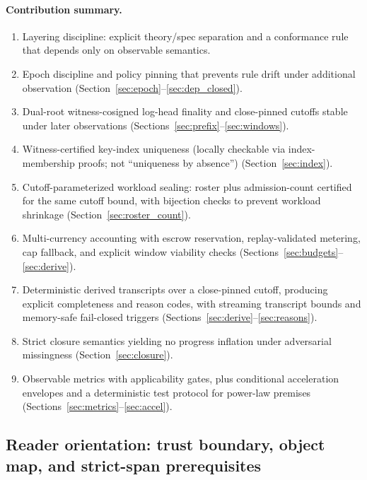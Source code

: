 \documentclass[11pt]{article}
\newcommand{\1}{\mathbf{1}}
\theoremstyle{definition}
\theoremstyle{plain}
\newenvironment{tightenum}{\begin{enumerate}\setlength\itemsep{0.2em}}{\end{enumerate}}
\begin{document}
\paragraph{Contribution summary.}
\begin{tightenum}
\item Layering discipline: explicit theory/spec separation and a conformance rule that depends only on observable semantics.
\item Epoch discipline and policy pinning that prevents rule drift under additional observation (Section~\ref{sec:epoch}--\ref{sec:dep_closed}).
\item Dual-root witness-cosigned log-head finality and close-pinned cutoffs stable under later observations (Sections~\ref{sec:prefix}--\ref{sec:windows}).
\item Witness-certified key-index uniqueness (locally checkable via index-membership proofs; not ``uniqueness by absence'') (Section~\ref{sec:index}).
\item Cutoff-parameterized workload sealing: roster plus admission-count certified for the same cutoff bound, with bijection checks to prevent workload shrinkage (Section~\ref{sec:roster_count}).
\item Multi-currency accounting with escrow reservation, replay-validated metering, cap fallback, and explicit window viability checks (Sections~\ref{sec:budgets}--\ref{sec:derive}).
\item Deterministic derived transcripts over a close-pinned cutoff, producing explicit completeness and reason codes, with streaming transcript bounds and memory-safe fail-closed triggers (Sections~\ref{sec:derive}--\ref{sec:reasons}).
\item Strict closure semantics yielding no progress inflation under adversarial missingness (Section~\ref{sec:closure}).
\item Observable metrics with applicability gates, plus conditional acceleration envelopes and a deterministic test protocol for power-law premises (Sections~\ref{sec:metrics}--\ref{sec:accel}).
\end{tightenum}

\subsection{Reader orientation: trust boundary, object map, and strict-span prerequisites}
\label{sec:reader_orient}
\end{document}
